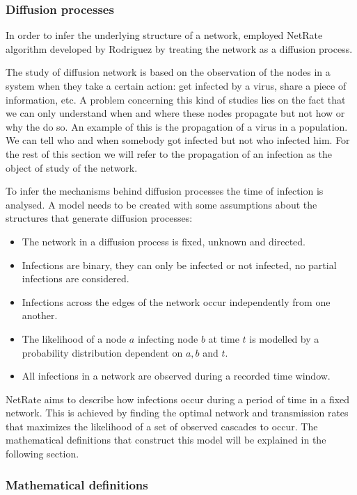 \documentclass[11pt]{article}
\begin{document}
\subsubsection{Diffusion processes}\label{sec:diffusion_processes}

In order to infer the underlying structure of a network, \cite{alexandru2018estimating} employed  NetRate algorithm developed by Rodriguez \cite{rodriguez2011uncovering} by treating the network as a diffusion process.

The study of diffusion network is based on the observation of the nodes in a system when they take a certain action: get infected by a virus, share a piece of information, etc. A problem concerning this kind of studies lies on the fact that we can only understand when and where these nodes propagate but not how or why the do so. An example of this is the propagation of a virus in a population. We can tell who and when somebody got infected but not who infected him. For the rest of this section we will refer to the propagation of an infection as the object of study of the network. 

To infer the mechanisms behind diffusion processes the time of infection is analysed. A model needs to be created with some assumptions about the structures that generate diffusion processes:

\begin{itemize}
\item The network in a diffusion process is fixed, unknown and directed.
\item Infections are binary, they can only be infected or not infected, no partial infections are considered.
\item Infections across the edges of the network occur independently from one another.
\item The likelihood of a node $a$ infecting node $b$ at time $t$ is modelled by a probability distribution dependent on $a, b$ and $t$.
\item All infections in a network are observed during a recorded time window.
\end{itemize}

NetRate aims to describe how infections occur during a period of time in a fixed network. This is achieved by finding the optimal network and transmission rates that maximizes the likelihood of a set of observed cascades to occur. The mathematical definitions that construct this model will be explained in the following section.


\subsubsection{Mathematical definitions}
\end{document}
